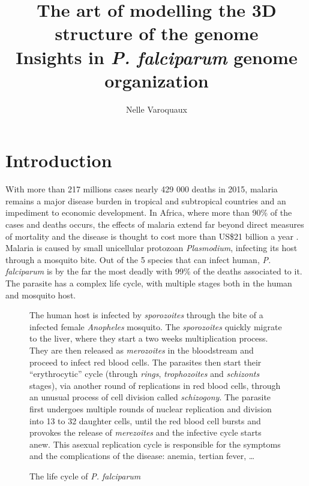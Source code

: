 \documentclass[letterpaper,12pt]{article}
\begin{document}
\title{The art of modelling the 3D structure of the genome\\
  Insights in {\em P. falciparum} genome organization}
\author{Nelle Varoquaux}



\begin{abstract}

\end{abstract}


\section{Introduction}
\label{sec:introduction}

With more than 217 millions cases nearly 429 000 deaths in 2015,  malaria
remains a major disease burden in tropical and subtropical countries and an
impediment to economic development. In Africa, where more than 90\% of the
cases and deaths occurs, the effects of malaria extend far beyond direct
measures of mortality and the disease is thought to cost more than US\$21
billion a year \citep{onwujekwe:do}.
Malaria is caused by small unicellular protozoan {\em Plasmodium}, infecting
its host through a mosquito bite. Out of the 5 species that can infect human,
{\em P. falciparum} is by the far the most deadly with 99\% of the deaths
associated to it. The parasite has a complex life cycle, with multiple stages
both in the human and mosquito host.


\begin{figure}
\caption{The life cycle of {\em P. falciparum}}{
\small
The human host is infected by \textit{sporozoites} through the bite of a infected female  {\em Anopheles}
mosquito. The \textit{sporozoites} quickly migrate to the liver, where they
start a two weeks multiplication process. They are then released as
\textit{merozoites} in the bloodstream and proceed to infect red blood cells. The
parasites then start their ``erythrocytic'' cycle (through \textit{rings},
\textit{trophozoites} and \textit{schizonts} stages), via another round of
replications in red blood cells, through an unusual process of cell division
called \textit{schizogony}. The parasite first undergoes multiple rounds of nuclear
replication and division into 13 to 32 daughter cells, until the red blood
cell bursts and provokes the release of \textit{merezoites} and the infective cycle
starts anew. This asexual replication cycle is responsible for the symptoms
and the complications of the disease: anemia, tertian fever, \dots}
\end{figure}
\end{document}
